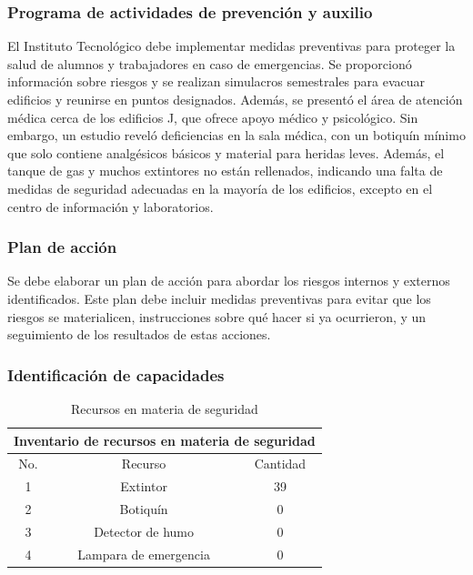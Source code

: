 \subsubsection{Programa de actividades de prevención y auxilio}

El Instituto Tecnológico debe implementar medidas preventivas para proteger la salud de alumnos y trabajadores en caso de emergencias. Se proporcionó información sobre riesgos y se realizan simulacros semestrales para evacuar edificios y reunirse en puntos designados. Además, se presentó el área de atención médica cerca de los edificios J, que ofrece apoyo médico y psicológico. Sin embargo, un estudio reveló deficiencias en la sala médica, con un botiquín mínimo que solo contiene analgésicos básicos y material para heridas leves. Además, el tanque de gas y muchos extintores no están rellenados, indicando una falta de medidas de seguridad adecuadas en la mayoría de los edificios, excepto en el centro de información y laboratorios.
% 
% 
\subsubsection{Plan de acción}

Se debe elaborar un plan de acción para abordar los riesgos internos y externos identificados. Este plan debe incluir medidas preventivas para evitar que los riesgos se materialicen, instrucciones sobre qué hacer si ya ocurrieron, y un seguimiento de los resultados de estas acciones.

%
%
\subsubsection{Identificación de capacidades}

\begin{table}[H]
    \centering
    \caption{Recursos en materia de seguridad}
    \begin{tabular}{c c c}
    \hline
    \multicolumn{3}{c}{Inventario de recursos en materia de seguridad}\\
    \hline
         No.& Recurso & Cantidad  \\
    \hline
         1& Extintor & 39  \\
    \hline
         2& Botiquín & 0  \\
    \hline
         3& Detector de humo & 0 \\
    \hline
         4& Lampara de emergencia & 0 \\
    \hline     
    \end{tabular}
    \label{tab:inventario}
\end{table}
%
%
